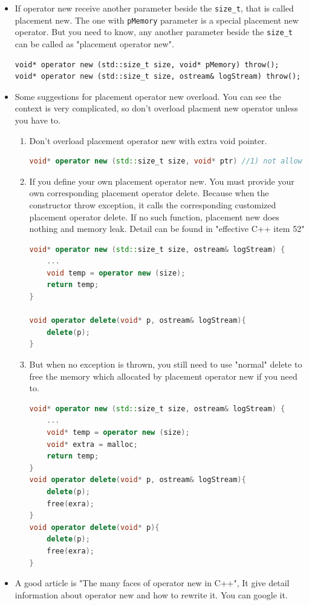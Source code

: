 \documentclass[a4paper,11pt,twoside]{book}
\begin{document}
\begin{itemize}
	
\item If operator new receive another parameter beside the \texttt{size\_t}, that is called placement new. The one with \texttt{pMemory} parameter is a special placement new operator. But you need to know, any another parameter beside the \texttt{size\_t} can be called as "placement operator new". 
\begin{lstlisting}[]
void* operator new (std::size_t size, void* pMemory) throw();
void* operator new (std::size_t size, ostream& logStream) throw();
\end{lstlisting}	
	
	\item Some suggestions for placement operator new overload. You can see the context is very complicated, so don't overload placment new operator unless you have to. 
\begin{enumerate}
	\item Don't overload placement operator new with extra void pointer.
\begin{lstlisting}[frame=single, language=c++]
void* operator new (std::size_t size, void* ptr) //1) not allow overload
\end{lstlisting}		
	\item If you define your own placement operator new. You must provide your own corresponding placement operator delete. Because when the constructor throw exception, it calls the corresponding customized placement operator delete. If no such function, placement new does nothing and memory leak. Detail can be found in "effective C++ item 52"
\begin{lstlisting}[frame=single, language=c++]
void* operator new (std::size_t size, ostream& logStream) {
	...
	void temp = operator new (size);
	return temp;
}

void operator delete(void* p, ostream& logStream){
	delete(p);
}	
\end{lstlisting}		

	\item But when no exception is thrown,  you still need to use "normal" delete to free the memory which allocated by placement operator new if you need to.
\begin{lstlisting}[frame=single, language=c++]
void* operator new (std::size_t size, ostream& logStream) {
	...
	void* temp = operator new (size);
	void* extra = malloc;
	return temp;
}
void operator delete(void* p, ostream& logStream){
	delete(p);
	free(exra);
}	
void operator delete(void* p){
	delete(p);
	free(exra);
}	
\end{lstlisting}		
\end{enumerate}			
	
	\item A good article is "The many faces of operator new in C++", It give  detail information about operator new and how to rewrite it. You can google it.
\end{itemize}
\end{document}
